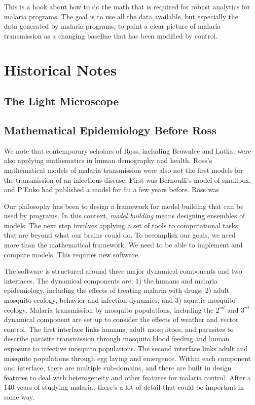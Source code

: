 \documentclass[
]{book}
\begin{document}
This is a book about how to do the math that is required for robust analytics for malaria programs. The goal is to use all the data available, but especially the data generated by malaria programs, to paint a clear picture of malaria transmission as a changing baseline that has been modified by control.

\section{Historical Notes}\label{historical-notes}

\subsection{The Light Microscope}\label{the-light-microscope}

\subsection{Mathematical Epidemiology Before Ross}\label{mathematical-epidemiology-before-ross}

We note that contemporary scholars of Ross, including Brownlee and Lotka, were also applying mathematics in human demography and health.
Ross's mathematical models of malaria transmission were also not the first models for the transmission of an infectious disease.
First was Bernoulli's model of smallpox, and P'Enko had published a model for flu a few years before.
Ross was

Our philosophy has been to design a framework for model building that can be used by programs.
In this context, \emph{model building} means designing ensembles of models. The next step involves applying a set of tools to computational tasks that are beyond what our brains could do. To accomplish our goals, we need more than the mathematical framework. We need to be able to implement and compute models. This requires new software.

The software is structured around three major dynamical components and two interfaces. The dynamical components are: 1) the humans and malaria epidemiology, including the effects of treating malaria with drugs; 2) adult mosquito ecology, behavior and infection dynamics; and 3) aquatic mosquito ecology. Malaria transmission by mosquito populations, including the \(2^{nd}\) and \(3^{rd}\) dynamical component are set up to consider the effects of weather and vector control. The first interface links humans, adult mosquitoes, and parasites to describe parasite transmission through mosquito blood feeding and human exposure to infective mosquito populations. The second interface links adult and mosquito populations through egg laying and emergence. Within each component and interface, there are multiple sub-domains, and there are built in design features to deal with heterogeneity and other features for malaria control. After a 140 years of studying malaria, there's a lot of detail that could be important in some way.
\end{document}
